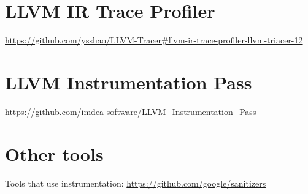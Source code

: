 \section{LLVM IR Trace Profiler}

\url{https://github.com/ysshao/LLVM-Tracer#llvm-ir-trace-profiler-llvm-triacer-12}

\section{LLVM Instrumentation Pass}

\url{https://github.com/imdea-software/LLVM_Instrumentation_Pass}

\section{Other tools}

Tools that use instrumentation: \url{https://github.com/google/sanitizers}
